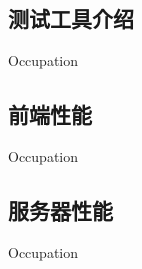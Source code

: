 
\subsection{测试工具介绍}
\indent
Occupation

\subsection{前端性能}
\indent
Occupation

\subsection{服务器性能}
\indent
Occupation


\clearpage